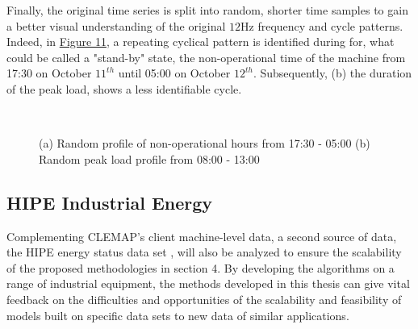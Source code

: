 Finally, the original time series is split into random, shorter time samples to gain a better visual understanding of the original $12$Hz frequency and cycle patterns. Indeed, in \hyperlink{figure.11}{Figure 11}, a repeating cyclical pattern is identified during for, what could be called a "stand-by" state, the non-operational time of the machine from 17:30 on October $11^{th}$ until 05:00 on October $12^{th}$. Subsequently, (b) the duration of the peak load, shows a less identifiable cycle. 

\begin{figure}[H]
    \centering
    \graphicspath{ {./images/} }
     \\
    \caption{(a) Random profile of non-operational hours from 17:30 - 05:00 (b) Random peak load profile from 08:00 - 13:00}  \label{fig:AB}
    \label{fig:my_label}
\end{figure}


\subsection{HIPE Industrial Energy}
Complementing CLEMAP's client machine-level data, a second source of data, the HIPE energy status data set \cite{HIPE}, will also be analyzed to ensure the scalability of the proposed methodologies in section 4. By developing the algorithms on a range of industrial equipment, the methods developed in this thesis can give vital feedback on the difficulties and opportunities of the scalability and feasibility of models built on specific data sets to new data of similar applications. 

